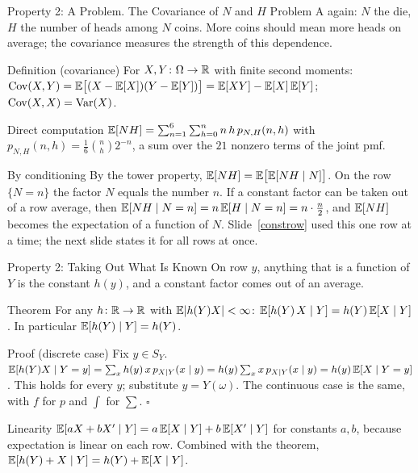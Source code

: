 \begin{frame}{Property 2: A Problem. The Covariance of $N$ and $H$}
  \small
  Problem A again: $N$ the die, $H$ the number of heads among $N$ coins. More coins should mean more heads on average; the covariance measures the strength of this dependence.
  \begin{block}{Definition (covariance)}
    For $X,Y\colon\Omega\to\mathbb{R}$ with finite second moments: \quad $\operatorname{Cov}(X,Y)=\mathbb{E}\big[(X-\mathbb{E}[X])(Y-\mathbb{E}[Y])\big]=\mathbb{E}[XY]-\mathbb{E}[X]\,\mathbb{E}[Y]$; \quad $\operatorname{Cov}(X,X)=\operatorname{Var}(X)$.
  \end{block}
  \begin{block}{Direct computation}
    $\mathbb{E}[NH]=\sum_{n=1}^6\sum_{h=0}^n n\,h\,p_{N,H}(n,h)$ with $p_{N,H}(n,h)=\tfrac16\binom nh2^{-n}$, a sum over the $21$ nonzero terms of the joint pmf.
  \end{block}
  \begin{block}{By conditioning}
    By the tower property, $\mathbb{E}[NH]=\mathbb{E}\big[\mathbb{E}[NH\mid N]\big]$. On the row $\{N=n\}$ the factor $N$ equals the number $n$. If a constant factor can be taken out of a row average, then
    $\mathbb{E}[NH\mid N=n]=n\,\mathbb{E}[H\mid N=n]=n\cdot\tfrac n2$,
    and $\mathbb{E}[NH]$ becomes the expectation of a function of $N$. Slide~\ref{constrow} used this one row at a time; the next slide states it for all rows at once.
  \end{block}
\end{frame}

\begin{frame}{Property 2: Taking Out What Is Known}
  \small
  \label{takeout}%
  On row $y$, anything that is a function of $Y$ is the constant $h(y)$, and a constant factor comes out of an average.
  \begin{block}{Theorem}
    For any $h\colon\mathbb{R}\to\mathbb{R}$ with $\mathbb{E}|h(Y)X|<\infty$: \quad $\mathbb{E}[h(Y)\,X\mid Y]=h(Y)\,\mathbb{E}[X\mid Y]$. \quad In particular $\mathbb{E}[h(Y)\mid Y]=h(Y)$.
  \end{block}
  \begin{block}{Proof (discrete case)}
    Fix $y\in S_Y$. $\mathbb{E}[h(Y)X\mid Y=y]=\sum_x h(y)\,x\,p_{X\mid Y}(x\mid y)=h(y)\sum_x x\,p_{X\mid Y}(x\mid y)=h(y)\,\mathbb{E}[X\mid Y=y]$.
    This holds for every $y$; substitute $y=Y(\omega)$. The continuous case is the same, with $f$ for $p$ and $\int$ for $\sum$. \hfill$\square$
  \end{block}
  \begin{block}{Linearity}
    $\mathbb{E}[aX+bX'\mid Y]=a\,\mathbb{E}[X\mid Y]+b\,\mathbb{E}[X'\mid Y]$ for constants $a,b$, because expectation is linear on each row.
    Combined with the theorem, $\mathbb{E}[h(Y)+X\mid Y]=h(Y)+\mathbb{E}[X\mid Y]$.
  \end{block}
\end{frame}

